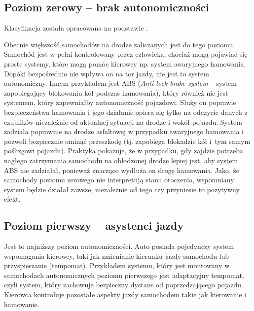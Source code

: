
\subsection{Poziom zerowy -- brak autonomiczności}

Klasyfikacja została opracowana na podstawie \cite{S3}. %

Obecnie większość samochodów na drodze zaliczanych jest do tego poziomu. 
Samochód jest w pełni kontrolowany przez człowieka, chociaż mogą pojawiać się proste systemy, które mogą pomóc kierowcy np. system awaryjnego hamowania. 
Dopóki bezpośrednio nie wpływa on na tor jazdy, nie jest to system autonomiczny. 
Innym przykładem jest ABS (\textit{Anti-lock brake system} -- system zapobiegający blokowaniu kół podczas hamowania), który również nie jest systemem, który zapewniałby autonomiczność pojazdowi.
Służy on poprawie bezpieczeństwa hamowania i jego działanie opiera się tylko na odczycie danych z czujników niezależnie od aktualnej sytuacji na drodze i wokół pojazdu. 
System zadziała poprawnie na drodze asfaltowej w przypadku awaryjnego hamowania i pozwoli bezpiecznie ominąć przeszkodę (tj. zapobiega blokadzie kół i~tym samym poślizgowi pojazdu). 
Praktyka pokazuje, że w przypadku, gdy zajdzie potrzeba nagłego zatrzymania samochodu na oblodzonej drodze lepiej jest, aby system ABS nie zadziałał, ponieważ znacząco wydłuża on drogę hamowania. 
Jako, że samochody poziomu zerowego nie interpretują stanu otoczenia, wspomniany system będzie działał zawsze, niezależnie od tego czy przyniesie to pozytywny efekt. 


\subsection{Poziom pierwszy -- asystenci jazdy}

Jest to najniższy poziom autonomiczności. 
Auto posiada pojedynczy system wspomagania kierowcy, taki jak zmienianie kierunku jazdy samochodu lub przyspieszanie (tempomat). 
Przykładem systemu, który jest montowany w samochodach autonomicznych poziomu pierwszego jest adaptacyjny tempomat, czyli system, który zachowuje bezpieczny dystans od poprzedzającego pojazdu. 
Kierowca kontroluje pozostałe aspekty jazdy samochodem takie jak kierowanie i hamowanie. 


